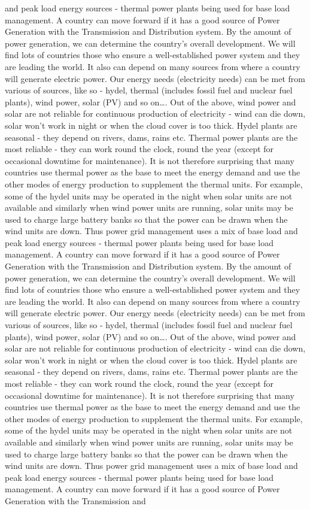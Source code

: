 \documentclass[10pt, a4paper]{article}
\begin{document}
and peak load energy sources - thermal power plants being used for base load management. A country can move forward if it has a good source of Power Generation with the Transmission and Distribution system. By the amount of power generation, we can determine the country’s overall development. We will find lots of countries those who ensure a well-established power system and they are leading the world. It also can depend on many sources from where a country will generate electric power. Our energy needs (electricity needs) can be met from various of sources, like so - hydel, thermal (includes fossil fuel and nuclear fuel plants), wind power, solar (PV) and so on\dots. Out of the above, wind power and solar are not reliable for continuous production of electricity - wind can die down, solar won’t work in night or when the cloud cover is too thick. Hydel plants are seasonal - they depend on rivers, dams, rains etc. Thermal power plants are the most reliable - they can work round the clock, round the year (except for occasional downtime for maintenance). It is not therefore surprising that many countries use thermal power as the base to meet the energy demand and use the other modes of energy production to supplement the thermal units. For example, some of the hydel units may be operated in the night when solar units are not available and similarly when wind power units are running, solar units may be used to charge large battery banks so that the power can be drawn when the wind units are down. Thus power grid management uses a mix of base load and peak load energy sources - thermal power plants being used for base load management. A country can move forward if it has a good source of Power Generation with the Transmission and Distribution system. By the amount of power generation, we can determine the country’s overall development. We will find lots of countries those who ensure a well-established power system and they are leading the world. It also can depend on many sources from where a country will generate electric power. Our energy needs (electricity needs) can be met from various of sources, like so - hydel, thermal (includes fossil fuel and nuclear fuel plants), wind power, solar (PV) and so on\dots. Out of the above, wind power and solar are not reliable for continuous production of electricity - wind can die down, solar won’t work in night or when the cloud cover is too thick. Hydel plants are seasonal - they depend on rivers, dams, rains etc. Thermal power plants are the most reliable - they can work round the clock, round the year (except for occasional downtime for maintenance). It is not therefore surprising that many countries use thermal power as the base to meet the energy demand and use the other modes of energy production to supplement the thermal units. For example, some of the hydel units may be operated in the night when solar units are not available and similarly when wind power units are running, solar units may be used to charge large battery banks so that the power can be drawn when the wind units are down. Thus power grid management uses a mix of base load and peak load energy sources - thermal power plants being used for base load management. A country can move forward if it has a good source of Power Generation with the Transmission and 
\end{document}
